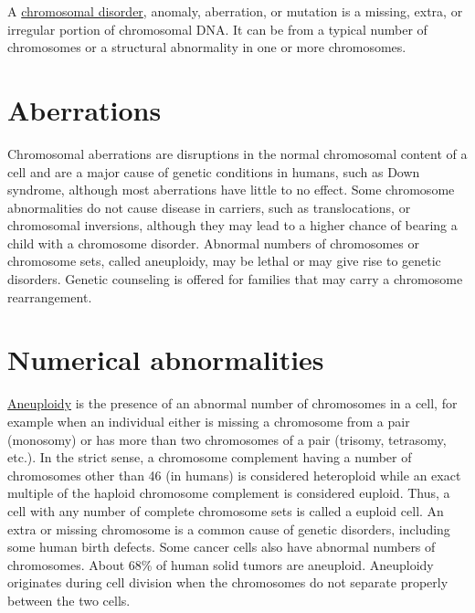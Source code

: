 A \href{https://en.wikipedia.org/wiki/Chromosome_abnormality}{chromosomal disorder}, anomaly, aberration, or mutation is a missing, extra, or irregular portion of chromosomal DNA. It can be from a typical number of chromosomes or a structural abnormality in one or more chromosomes.

\hypertarget{aberrations}{%
\section{Aberrations}\label{aberrations}}

Chromosomal aberrations are disruptions in the normal chromosomal content of a cell and are a major cause of genetic conditions in humans, such as Down syndrome, although most aberrations have little to no effect. Some chromosome abnormalities do not cause disease in carriers, such as translocations, or chromosomal inversions, although they may lead to a higher chance of bearing a child with a chromosome disorder. Abnormal numbers of chromosomes or chromosome sets, called aneuploidy, may be lethal or may give rise to genetic disorders. Genetic counseling is offered for families that may carry a chromosome rearrangement.

\hypertarget{numerical-abnormalities}{%
\section{Numerical abnormalities}\label{numerical-abnormalities}}

\href{https://en.wikipedia.org/wiki/Aneuploidy}{Aneuploidy} is the presence of an abnormal number of chromosomes in a cell, for example when an individual either is missing a chromosome from a pair (monosomy) or has more than two chromosomes of a pair (trisomy, tetrasomy, etc.). In the strict sense, a chromosome complement having a number of chromosomes other than 46 (in humans) is considered heteroploid while an exact multiple of the haploid chromosome complement is considered euploid. Thus, a cell with any number of complete chromosome sets is called a euploid cell. An extra or missing chromosome is a common cause of genetic disorders, including some human birth defects. Some cancer cells also have abnormal numbers of chromosomes. About 68\% of human solid tumors are aneuploid. Aneuploidy originates during cell division when the chromosomes do not separate properly between the two cells.

